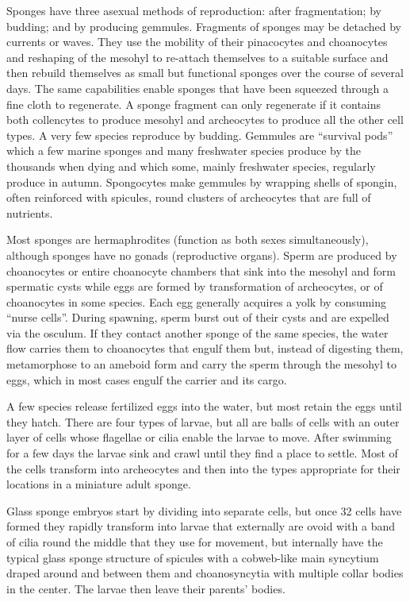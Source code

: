 \documentclass[]{book}
\begin{document}
Sponges have three asexual methods of reproduction: after fragmentation; by budding; and by producing gemmules. Fragments of sponges may be detached by currents or waves. They use the mobility of their pinacocytes and choanocytes and reshaping of the mesohyl to re-attach themselves to a suitable surface and then rebuild themselves as small but functional sponges over the course of several days. The same capabilities enable sponges that have been squeezed through a fine cloth to regenerate. A sponge fragment can only regenerate if it contains both collencytes to produce mesohyl and archeocytes to produce all the other cell types. A very few species reproduce by budding. Gemmules are ``survival pods'' which a few marine sponges and many freshwater species produce by the thousands when dying and which some, mainly freshwater species, regularly produce in autumn. Spongocytes make gemmules by wrapping shells of spongin, often reinforced with spicules, round clusters of archeocytes that are full of nutrients.

Most sponges are hermaphrodites (function as both sexes simultaneously), although sponges have no gonads (reproductive organs). Sperm are produced by choanocytes or entire choanocyte chambers that sink into the mesohyl and form spermatic cysts while eggs are formed by transformation of archeocytes, or of choanocytes in some species. Each egg generally acquires a yolk by consuming ``nurse cells''. During spawning, sperm burst out of their cysts and are expelled via the osculum. If they contact another sponge of the same species, the water flow carries them to choanocytes that engulf them but, instead of digesting them, metamorphose to an ameboid form and carry the sperm through the mesohyl to eggs, which in most cases engulf the carrier and its cargo.

A few species release fertilized eggs into the water, but most retain the eggs until they hatch. There are four types of larvae, but all are balls of cells with an outer layer of cells whose flagellae or cilia enable the larvae to move. After swimming for a few days the larvae sink and crawl until they find a place to settle. Most of the cells transform into archeocytes and then into the types appropriate for their locations in a miniature adult sponge.

Glass sponge embryos start by dividing into separate cells, but once 32 cells have formed they rapidly transform into larvae that externally are ovoid with a band of cilia round the middle that they use for movement, but internally have the typical glass sponge structure of spicules with a cobweb-like main syncytium draped around and between them and choanosyncytia with multiple collar bodies in the center. The larvae then leave their parents' bodies.
\end{document}
